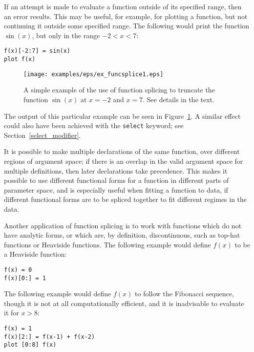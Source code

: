 If an attempt is made to evaluate a function outside of its specified range,
then an error results. This may be useful, for example, for plotting a
function, but not continuing it outside some specified range. The following
would print the function $\sin(x)$, but only in the range $-2<x<7$:

\begin{verbatim}
f(x)[-2:7] = sin(x)
plot f(x)
\end{verbatim}

\begin{figure}
\begin{center}
\texttt{[image: examples/eps/ex\_funcsplice1.eps]}
\end{center}
\caption{A simple example of the use of function splicing to truncate the function $\sin(x)$ at $x=-2$ and $x=7$. See details in the text.}
\label{fig:ex_funcsplice1}
\end{figure}

\label{splice} \noindent The output of this particular example can be seen in
Figure~\ref{fig:ex_funcsplice1}. A similar effect could also have been achieved
with the {\tt select} keyword; see Section~\ref{select_modifier}.

It is possible to make multiple declarations of the same function, over
different regions of argument space; if there is an overlap in the valid
argument space for multiple definitions, then later declarations take
precedence. This makes it possible to use different functional forms for a
function in different parts of parameter space, and is especially useful when
fitting a function to data, if different functional forms are to be spliced
together to fit different regimes in the data.

Another application of function splicing is to work with functions which do not
have analytic forms, or which are, by definition, discontinuous, such as
top-hat functions or Heaviside functions. The following example would define
$f(x)$ to be a Heaviside function:

\begin{verbatim}
f(x) = 0
f(x)[0:] = 1
\end{verbatim}

\noindent The following example would define $f(x)$ to follow the Fibonacci
sequence, though it is not at all computationally efficient, and it is
inadvisable to evaluate it for $x>8$:

\begin{verbatim}
f(x) = 1
f(x)[2:] = f(x-1) + f(x-2)
plot [0:8] f(x)
\end{verbatim}

